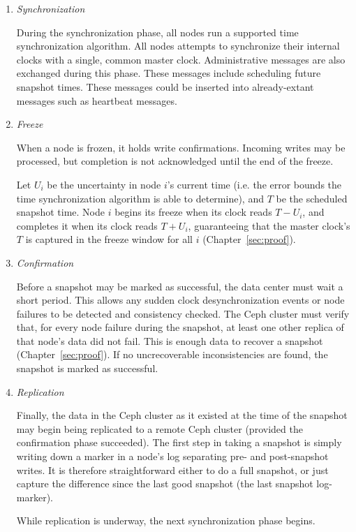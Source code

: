 \begin{enumerate}

\item \emph{Synchronization}

  During the synchronization phase, all nodes run a supported time
  synchronization algorithm. All nodes attempts to synchronize their
  internal clocks with a single, common master
  clock\footnotemark. Administrative messages are also exchanged
  during this phase. These messages include scheduling future snapshot
  times. These messages could be inserted into already-extant messages
  such as heartbeat messages.


\item \emph{Freeze}
  
  When a node is frozen, it holds write confirmations. Incoming writes
  may be processed, but completion is not acknowledged until the end
  of the freeze.
  
  Let $U_i$ be the uncertainty in node $i$'s current time (i.e. the
  error bounds the time synchronization algorithm is able to
  determine), and $T$ be the scheduled snapshot time. Node $i$ begins
  its freeze when its clock reads $T - U_i$, and completes it when its
  clock reads $T + U_i$, guaranteeing that the master clock's $T$ is
  captured in the freeze window for all $i$ (Chapter~\ref{sec:proof}).

\item \emph{Confirmation}

  Before a snapshot may be marked as successful, the data center must
  wait a short period. This allows any sudden clock desynchronization
  events or node failures to be detected and consistency checked. The
  Ceph cluster must verify that, for every node failure during the
  snapshot, at least one other replica of that node's data did not
  fail. This is enough data to recover a snapshot
  (Chapter~\ref{sec:proof}).  If no uncrecoverable inconsistencies are
  found, the snapshot is marked as successful.

\item \emph{Replication}
  
  Finally, the data in the Ceph cluster as it existed at the time of
  the snapshot may begin being replicated to a remote Ceph cluster
  (provided the confirmation phase succeeded).  The first step in
  taking a snapshot is simply writing down a marker in a node's log
  separating pre- and post-snapshot writes. It is therefore
  straightforward either to do a full snapshot, or just capture the
  difference since the last good snapshot (the last snapshot
  log-marker).
  
  While replication is underway, the next synchronization phase begins.

\end{enumerate}

